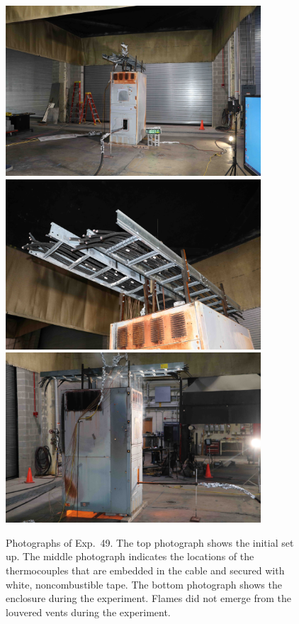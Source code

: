 \begin{figure}[p]
\centering
\includegraphics[height=2.50in]{../FIGURES/Test_49_setup} \\ \vspace{0.1in}
\includegraphics[height=2.50in]{../FIGURES/Test_49_cables} \\ \vspace{0.1in}
\includegraphics[height=2.50in]{../FIGURES/Test_49_fire}
\caption[Photographs of Exp.~49]{Photographs of Exp.~49. The top photograph shows the initial set up. The middle photograph indicates the locations of the thermocouples that are embedded in the cable and secured with white, noncombustible tape. The bottom photograph shows the enclosure during the experiment. Flames did not emerge from the louvered vents during the experiment. }
\label{fig:Test_49_photos}
\end{figure}


